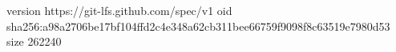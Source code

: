version https://git-lfs.github.com/spec/v1
oid sha256:a98a2706be17bf104ffd2c4e348a62cb311bee66759f9098f8c63519e7980d53
size 262240
